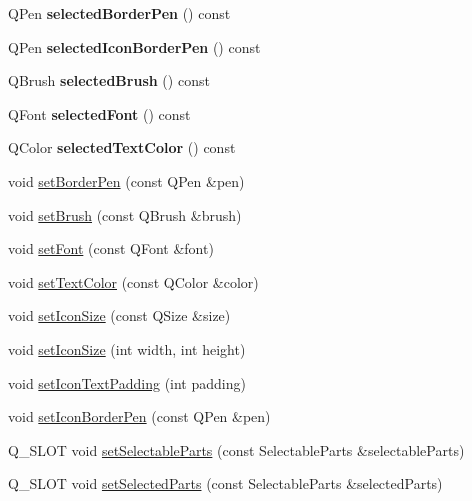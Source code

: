 \begin{DoxyCompactItemize}
Q\+Pen {\bfseries selected\+Border\+Pen} () const
\item 
\mbox{\label{class_q_c_p_legend_ad8eb320ca3a25928982a65163e8f883b}} 
Q\+Pen {\bfseries selected\+Icon\+Border\+Pen} () const
\item 
\mbox{\label{class_q_c_p_legend_a77dfa9340f68ca195f1817a93db09757}} 
Q\+Brush {\bfseries selected\+Brush} () const
\item 
\mbox{\label{class_q_c_p_legend_a483ffd35d64710a165da87b9d9f11110}} 
Q\+Font {\bfseries selected\+Font} () const
\item 
\mbox{\label{class_q_c_p_legend_ab9b469b27787bfb2ce6c8978a31821af}} 
Q\+Color {\bfseries selected\+Text\+Color} () const
\item 
void \mbox{\hyperlink{class_q_c_p_legend_a866a9e3f5267de7430a6c7f26a61db9f}{set\+Border\+Pen}} (const Q\+Pen \&pen)
\item 
void \mbox{\hyperlink{class_q_c_p_legend_a497bbcd38baa3598c08e2b3f48103f23}{set\+Brush}} (const Q\+Brush \&brush)
\item 
void \mbox{\hyperlink{class_q_c_p_legend_aa4cda8499e3cb0f3be415edc02984c73}{set\+Font}} (const Q\+Font \&font)
\item 
void \mbox{\hyperlink{class_q_c_p_legend_ae1eb239ff4a4632fe1b6c3e668d845c6}{set\+Text\+Color}} (const Q\+Color \&color)
\item 
void \mbox{\hyperlink{class_q_c_p_legend_a8b0740cce488bf7010da6beda6898984}{set\+Icon\+Size}} (const Q\+Size \&size)
\item 
void \mbox{\hyperlink{class_q_c_p_legend_a96b1a37fd4ee6a9778e6e54fe56ab6c2}{set\+Icon\+Size}} (int width, int height)
\item 
void \mbox{\hyperlink{class_q_c_p_legend_a62973bd69d5155e8ea3141366e8968f6}{set\+Icon\+Text\+Padding}} (int padding)
\item 
void \mbox{\hyperlink{class_q_c_p_legend_a2f2c93d18a651f4ff294bb3f026f49b8}{set\+Icon\+Border\+Pen}} (const Q\+Pen \&pen)
\item 
Q\+\_\+\+S\+L\+OT void \mbox{\hyperlink{class_q_c_p_legend_a9ce60aa8bbd89f62ae4fa83ac6c60110}{set\+Selectable\+Parts}} (const Selectable\+Parts \&selectable\+Parts)
\item 
Q\+\_\+\+S\+L\+OT void \mbox{\hyperlink{class_q_c_p_legend_a2aee309bb5c2a794b1987f3fc97f8ad8}{set\+Selected\+Parts}} (const Selectable\+Parts \&selected\+Parts)

\end{DoxyCompactItemize}
